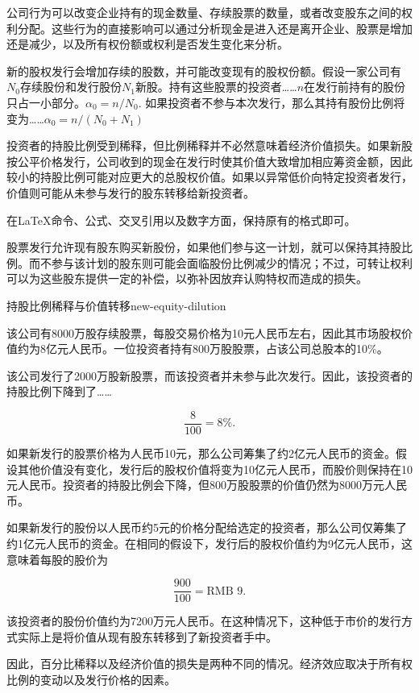 公司行为可以改变企业持有的现金数量、存续股票的数量，或者改变股东之间的权利分配。这些行为的直接影响可以通过分析现金是进入还是离开企业、股票是增加还是减少，以及所有权份额或权利是否发生变化来分析。

新的股权发行会增加存续的股数，并可能改变现有的股权份额。假设一家公司有\(N_0\)存续股份和发行股份\(N_1\)新股。持有这些股票的投资者……\(n\)在发行前持有的股份只占一小部分。$\alpha_0=n/N_0$. 如果投资者不参与本次发行，那么其持有股份比例将变为……$\alpha_0=n/(N_0+N_1)$  

投资者的持股比例受到稀释，但比例稀释并不必然意味着经济价值损失。如果新股按公平价格发行，公司收到的现金在发行时使其价值大致增加相应筹资金额，因此较小的持股比例可能对应更大的总股权价值。如果以异常低价向特定投资者发行，价值则可能从未参与发行的股东转移给新投资者。

在LaTeX命令、公式、交叉引用以及数字方面，保持原有的格式即可。  

股票发行允许现有股东购买新股份，如果他们参与这一计划，就可以保持其持股比例。而不参与该计划的股东则可能会面临股份比例减少的情况；不过，可转让权利可以为这些股东提供一定的补偿，以弥补因放弃认购特权而造成的损失。

\begin{example}{持股比例稀释与价值转移}{new-equity-dilution}

该公司有8000万股存续股票，每股交易价格为10元人民币左右，因此其市场股权价值约为8亿元人民币。一位投资者持有800万股股票，占该公司总股本的10\%。

该公司发行了2000万股新股票，而该投资者并未参与此次发行。因此，该投资者的持股比例下降到了……

\[
\frac{8}{100}=8\%.
\]

如果新发行的股票价格为人民币10元，那么公司筹集了约2亿元人民币的资金。假设其他价值没有变化，发行后的股权价值将变为10亿元人民币，而股价则保持在10元人民币。投资者的持股比例会下降，但800万股股票的价值仍然为8000万元人民币。

如果新发行的股份以人民币约5元的价格分配给选定的投资者，那么公司仅筹集了约1亿元人民币的资金。在相同的假设下，发行后的股权价值约为9亿元人民币，这意味着每股的股价为

\[
\frac{900}{100}=\text{RMB }9.
\]

该投资者的股份价值约为7200万元人民币。在这种情况下，这种低于市价的发行方式实际上是将价值从现有股东转移到了新投资者手中。

因此，百分比稀释以及经济价值的损失是两种不同的情况。经济效应取决于所有权比例的变动以及发行价格的因素。

\end{example}

